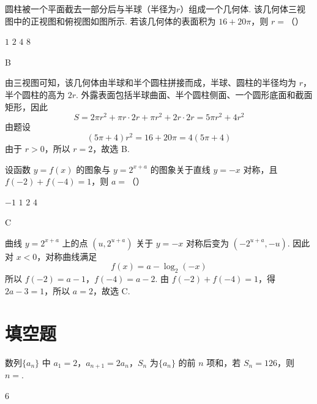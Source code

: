 \begin{problem}
圆柱被一个平面截去一部分后与半球（半径为\(r\)）组成一个几何体. 该几何体三视图中的正视图和俯视图如图所示. 若该几何体的表面积为 \(16 + 20\pi\)，则 \(r =\)（\quad）


\choices
    {\(1\)}
    {\(2\)}
    {\(4\)}
    {\(8\)}
\end{problem}

\begin{answer}
B
\end{answer}

\begin{solution}
由三视图可知，该几何体由半球和半个圆柱拼接而成，半球、圆柱的半径均为 \(r\)，半个圆柱的高为 \(2r\). 外露表面包括半球曲面、半个圆柱侧面、一个圆形底面和截面矩形，因此
\[
S=2\pi r^{2}+\pi r\cdot2r+\pi r^{2}+2r\cdot2r
=5\pi r^{2}+4r^{2}
\]
由题设
\[
(5\pi+4)r^{2}=16+20\pi=4(5\pi+4)
\]
由于 \(r>0\)，所以 \(r=2\)，故选 B.
\end{solution}

\begin{problem}
设函数 \( y = f(x) \) 的图象与 \( y = 2^{x + a} \) 的图象关于直线 \( y = -x \) 对称，且 \( f(-2) + f(-4) = 1 \)，则 \( a =\)（\quad）

\choices
    {\(-1\)}
    {\(1\)}
    {\(2\)}
    {\(4\)}
\end{problem}

\begin{answer}
C
\end{answer}

\begin{solution}
曲线 \(y=2^{x+a}\) 上的点 \((u,2^{u+a})\) 关于 \(y=-x\) 对称后变为 \((-2^{u+a},-u)\). 因此对 \(x<0\)，对称曲线满足
\[
f(x)=a-\log_{2}(-x)
\]
所以
\(f(-2)=a-1\)，\(f(-4)=a-2\).
由 \(f(-2)+f(-4)=1\)，得 \(2a-3=1\)，所以 \(a=2\)，故选 C.
\end{solution}

\section{填空题}

\begin{problem}
数列\(\{a_{n}\}\) 中 \(a_{1}=2\)，\(a_{n+1}=2a_{n}\)，\(S_{n}\) 为\(\{a_{n}\}\) 的前 \(n\) 项和，若 \(S_{n}=126\)，则 \(n=\)\fillinblank{}.
\end{problem}

\begin{answer}
\(6\)
\end{answer}

